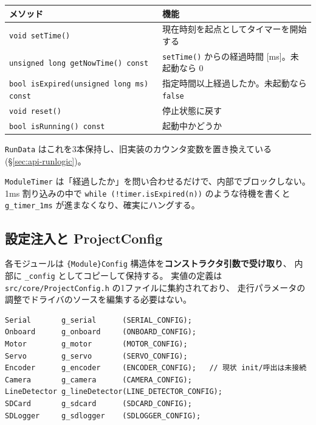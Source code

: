 \documentclass[a4paper,11pt,dvipdfmx]{jsarticle}
\begin{document}
\begin{tabularx}{\textwidth}{l X}
\toprule
\textbf{メソッド} & \textbf{機能} \\
\midrule
\texttt{void setTime()}                    & 現在時刻を起点としてタイマーを開始する \\
\texttt{unsigned long getNowTime() const}  & \texttt{setTime()} からの経過時間 [ms]。未起動なら 0 \\
\texttt{bool isExpired(unsigned long ms) const} & 指定時間以上経過したか。未起動なら \texttt{false} \\
\texttt{void reset()}                      & 停止状態に戻す \\
\texttt{bool isRunning() const}            & 起動中かどうか \\
\bottomrule
\end{tabularx}

\vspace{2mm}
\texttt{RunData} はこれを3本保持し、旧実装のカウンタ変数を置き換えている
(\hyperref[sec:api-runlogic]{§\ref*{sec:api-runlogic}})。

\begin{notebox}[待ちループを書かないこと]
\texttt{ModuleTimer} は「経過したか」を問い合わせるだけで、内部でブロックしない。
1ms 割り込みの中で \texttt{while (!timer.isExpired(n))} のような待機を書くと
\texttt{g\_timer\_1ms} が進まなくなり、確実にハングする。
\end{notebox}

\subsection{設定注入と ProjectConfig}\label{sec:configinject}

各モジュールは \texttt{\{Module\}Config} 構造体を\textbf{コンストラクタ引数で受け取り}、
内部に \texttt{\_config} としてコピーして保持する。
実値の定義は \texttt{src/core/ProjectConfig.h} の1ファイルに集約されており、
走行パラメータの調整でドライバのソースを編集する必要はない。

\begin{lstlisting}[caption={Config 注入によるインスタンス生成 (mcr\_camera\_2026base.cpp)},label=lst:configinject]
Serial       g_serial      (SERIAL_CONFIG);
Onboard      g_onboard     (ONBOARD_CONFIG);
Motor        g_motor       (MOTOR_CONFIG);
Servo        g_servo       (SERVO_CONFIG);
Encoder      g_encoder     (ENCODER_CONFIG);   // 現状 init/呼出は未接続
Camera       g_camera      (CAMERA_CONFIG);
LineDetector g_lineDetector(LINE_DETECTOR_CONFIG);
SDCard       g_sdcard      (SDCARD_CONFIG);
SDLogger     g_sdlogger    (SDLOGGER_CONFIG);
\end{lstlisting}
\end{document}
